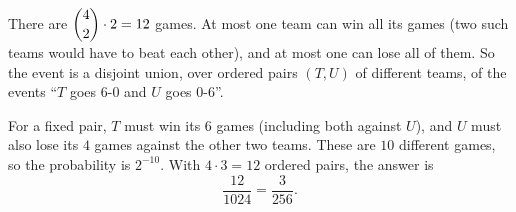 There are $\dbinom42\cdot2=12$ games. At most one team can win all its games (two such teams would have to beat each other), and at most one can lose all of them. So the event is a disjoint union, over ordered pairs $(T,U)$ of different teams, of the events ``$T$ goes $6$-$0$ and $U$ goes $0$-$6$''.

For a fixed pair, $T$ must win its $6$ games (including both against $U$), and $U$ must also lose its $4$ games against the other two teams. These are $10$ different games, so the probability is $2^{-10}$. With $4\cdot3=12$ ordered pairs, the answer is
\[
\dfrac{12}{1024}=\boxed{\dfrac{3}{256}}.
\]

